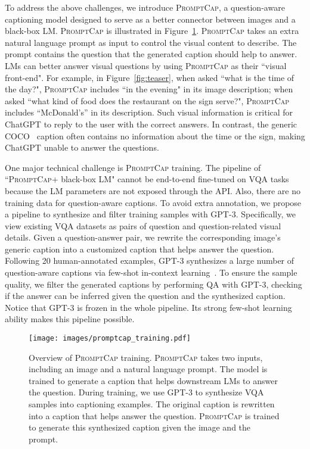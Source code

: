 \documentclass[10pt,twocolumn,letterpaper]{article}
\newcommand{\NAME}{\textsc{PromptCap}\xspace}
\begin{document}
To address the above challenges, we introduce \NAME, a question-aware captioning model designed to serve as a better connector between images and a black-box LM. \NAME is illustrated in Figure~\ref{fig:overview}. \NAME takes an extra natural language prompt as input to control the visual content to describe. The prompt contains the question that the generated caption should help to answer. 
LMs can better answer visual questions by using \NAME as their ``visual front-end".
For example, in Figure~\ref{fig:teaser}, when asked ``what is the time of the day?", \NAME includes ``in the evening" in its image description; when asked ``what kind of food does the restaurant on the sign serve?", \NAME includes ``McDonald's” in its description. Such visual information is critical for ChatGPT to reply to the user with the correct answers. In contrast, the generic COCO~\cite{lin2014microsoft} caption often contains no information about the time or the sign, making ChatGPT unable to answer the questions. 


One major technical challenge is \NAME training. The pipeline of ``\NAME + black-box LM" cannot be end-to-end fine-tuned on VQA tasks because the LM parameters are not exposed through the API. Also, there are no training data for question-aware captions. 
To avoid extra annotation, we propose a pipeline to synthesize and filter training samples with GPT-3.
Specifically, we view existing VQA datasets as pairs of question and question-related visual details.
Given a question-answer pair, we rewrite the corresponding image's generic caption into a customized caption that helps answer the question. Following 20 human-annotated examples, GPT-3 synthesizes a large number of question-aware captions via few-shot in-context learning~\cite{brown2020language}. To ensure the sample quality, we filter the generated captions by performing QA with GPT-3, checking if the answer can be inferred given the question and the synthesized caption.
Notice that GPT-3 is frozen in the whole pipeline. Its strong few-shot learning ability makes this pipeline possible.


\begin{figure}[t]
\centering
  \texttt{[image: images/promptcap\_training.pdf]}
  \caption{
Overview of \NAME training. \NAME takes two inputs, including an image and a natural language prompt. The model is trained to generate a caption that helps downstream LMs to answer the question. During training, we use GPT-3 to synthesize VQA samples into captioning examples. The original caption is rewritten into a caption that helps answer the question. \NAME is trained to generate this synthesized caption given the image and the prompt.
}

  \label{fig:overview}
\end{figure}
\end{document}
